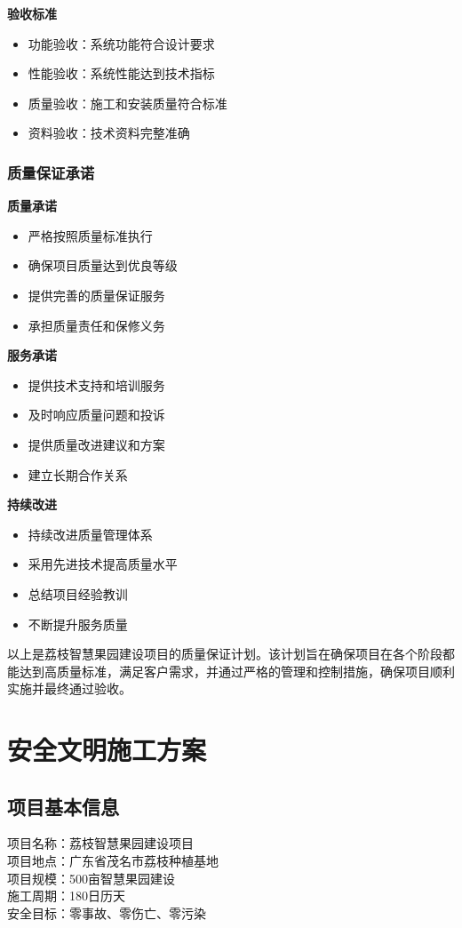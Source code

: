 \documentclass[UTF8,a4paper,12pt]{article}
\begin{document}
\textbf{验收标准}
\begin{itemize}
    \item 功能验收：系统功能符合设计要求
    \item 性能验收：系统性能达到技术指标
    \item 质量验收：施工和安装质量符合标准
    \item 资料验收：技术资料完整准确
\end{itemize}

\subsubsection{质量保证承诺}
\textbf{质量承诺}
\begin{itemize}
    \item 严格按照质量标准执行
    \item 确保项目质量达到优良等级
    \item 提供完善的质量保证服务
    \item 承担质量责任和保修义务
\end{itemize}

\textbf{服务承诺}
\begin{itemize}
    \item 提供技术支持和培训服务
    \item 及时响应质量问题和投诉
    \item 提供质量改进建议和方案
    \item 建立长期合作关系
\end{itemize}

\textbf{持续改进}
\begin{itemize}
    \item 持续改进质量管理体系
    \item 采用先进技术提高质量水平
    \item 总结项目经验教训
    \item 不断提升服务质量
\end{itemize}

以上是荔枝智慧果园建设项目的质量保证计划。该计划旨在确保项目在各个阶段都能达到高质量标准，满足客户需求，并通过严格的管理和控制措施，确保项目顺利实施并最终通过验收。

\section{安全文明施工方案}

\subsection{项目基本信息}
项目名称：荔枝智慧果园建设项目 \\
项目地点：广东省茂名市荔枝种植基地 \\
项目规模：500亩智慧果园建设 \\
施工周期：180日历天 \\
安全目标：零事故、零伤亡、零污染
\end{document}
